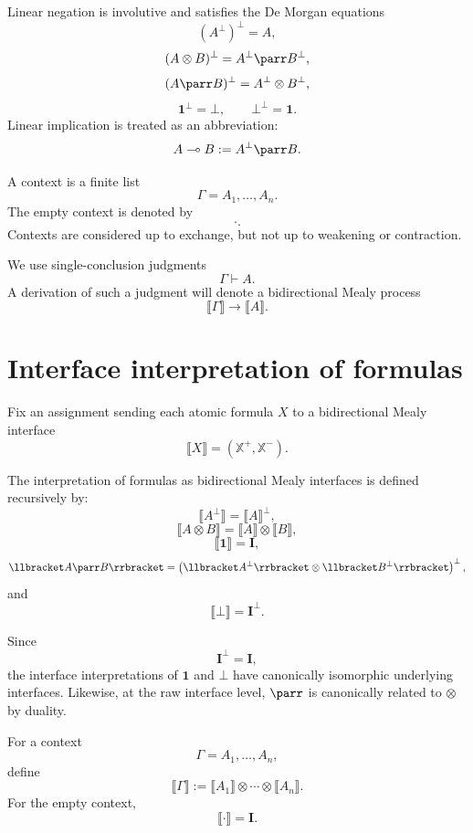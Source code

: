 Linear negation is involutive and satisfies the De Morgan equations
\[
(A^\bot)^\bot=A,
\]
\[
(A\otimes B)^\bot=A^\bot\parr B^\bot,
\]
\[
(A\parr B)^\bot=A^\bot\otimes B^\bot,
\]
\[
\mathbf 1^\bot=\bot,
\qquad
\bot^\bot=\mathbf 1.
\]
Linear implication is treated as an abbreviation:
\[
A\multimap B:=A^\bot\parr B.
\]

\begin{definition}[Contexts]
\label{def:mll-contexts}
A context is a finite list
\[
\Gamma=A_1,\dots,A_n.
\]
The empty context is denoted by
\[
\cdot.
\]
Contexts are considered up to exchange, but not up to weakening or
contraction.
\end{definition}

We use single-conclusion judgments
\[
\Gamma\vdash A.
\]
A derivation of such a judgment will denote a bidirectional Mealy process
\[
\llbracket \Gamma\rrbracket\to \llbracket A\rrbracket.
\]

\section{Interface interpretation of formulas}
\label{sec:interface-semantics-formulas}

Fix an assignment sending each atomic formula \(X\) to a bidirectional Mealy
interface
\[
\llbracket X\rrbracket
=
(\mathbb X^+,\mathbb X^-).
\]

\begin{definition}
\label{def:interface-interpretation}
The interpretation of formulas as bidirectional Mealy interfaces is defined
recursively by:
\[
\llbracket A^\bot\rrbracket
=
\llbracket A\rrbracket^\bot,
\]
\[
\llbracket A\otimes B\rrbracket
=
\llbracket A\rrbracket\otimes\llbracket B\rrbracket,
\]
\[
\llbracket \mathbf 1\rrbracket
=
\mathbf I,
\]
\[
\llbracket A\parr B\rrbracket
=
\left(
\llbracket A^\bot\rrbracket
\otimes
\llbracket B^\bot\rrbracket
\right)^\bot,
\]
and
\[
\llbracket \bot\rrbracket
=
\mathbf I^\bot.
\]
\end{definition}

Since
\[
\mathbf I^\bot=\mathbf I,
\]
the interface interpretations of \(\mathbf 1\) and \(\bot\) have canonically
isomorphic underlying interfaces.  Likewise, at the raw interface level,
\(\parr\) is canonically related to \(\otimes\) by duality.

\begin{definition}
\label{def:context-interpretation}
For a context
\[
\Gamma=A_1,\dots,A_n,
\]
define
\[
\llbracket \Gamma\rrbracket
:=
\llbracket A_1\rrbracket\otimes\cdots\otimes
\llbracket A_n\rrbracket.
\]
For the empty context,
\[
\llbracket \cdot\rrbracket=\mathbf I.
\]
\end{definition}

